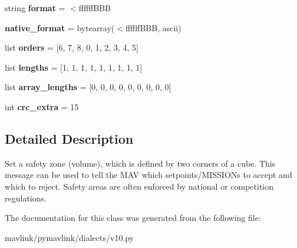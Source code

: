 \begin{DoxyCompactItemize}
\item 
\mbox{\label{classpymavlink_1_1dialects_1_1v10_1_1MAVLink__safety__set__allowed__area__message_aea69f800fd621d822a986b1b87af02c2}} 
string {\bfseries format} = \textquotesingle{}$<$ffffff\+B\+BB\textquotesingle{}
\item 
\mbox{\label{classpymavlink_1_1dialects_1_1v10_1_1MAVLink__safety__set__allowed__area__message_a1cfd46eaa00971461401166395b35211}} 
{\bfseries native\+\_\+format} = bytearray(\textquotesingle{}$<$ffffff\+B\+BB\textquotesingle{}, \textquotesingle{}ascii\textquotesingle{})
\item 
\mbox{\label{classpymavlink_1_1dialects_1_1v10_1_1MAVLink__safety__set__allowed__area__message_a17719e20680b654825752ff5cf51d6d9}} 
list {\bfseries orders} = \mbox{[}6, 7, 8, 0, 1, 2, 3, 4, 5\mbox{]}
\item 
\mbox{\label{classpymavlink_1_1dialects_1_1v10_1_1MAVLink__safety__set__allowed__area__message_a81860084d5aba33e397af3c820297818}} 
list {\bfseries lengths} = \mbox{[}1, 1, 1, 1, 1, 1, 1, 1, 1\mbox{]}
\item 
\mbox{\label{classpymavlink_1_1dialects_1_1v10_1_1MAVLink__safety__set__allowed__area__message_a241c14bd366da3fc1f8e34457a3b26c9}} 
list {\bfseries array\+\_\+lengths} = \mbox{[}0, 0, 0, 0, 0, 0, 0, 0, 0\mbox{]}
\item 
\mbox{\label{classpymavlink_1_1dialects_1_1v10_1_1MAVLink__safety__set__allowed__area__message_aa14d3d738f508c7c80926d1eddfae2b6}} 
int {\bfseries crc\+\_\+extra} = 15
\end{DoxyCompactItemize}


\subsection{Detailed Description}
\begin{DoxyVerb}Set a safety zone (volume), which is defined by two corners of
a cube. This message can be used to tell the MAV which
setpoints/MISSIONs to accept and which to reject. Safety areas
are often enforced by national or competition regulations.
\end{DoxyVerb}
 

The documentation for this class was generated from the following file\+:\begin{DoxyCompactItemize}
\item 
mavlink/pymavlink/dialects/v10.\+py\end{DoxyCompactItemize}
